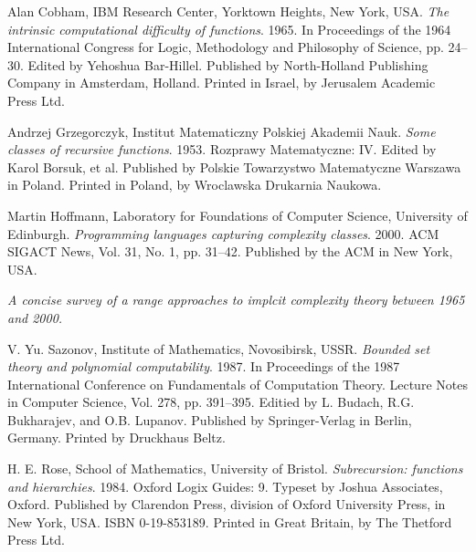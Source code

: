 \begin{thebibliography}{9} %


Alan Cobham, IBM Research Center, Yorktown Heights, New York, USA. \emph{The
intrinsic computational difficulty of functions}. 1965. In Proceedings of the
1964 International Congress for Logic, Methodology and Philosophy of Science,
pp. 24--30. Edited by Yehoshua Bar-Hillel. Published by North-Holland
Publishing Company in Amsterdam, Holland.  Printed in Israel, by Jerusalem
Academic Press Ltd.

\backrefprint


Andrzej Grzegorczyk, Institut Matematiczny Polskiej Akademii Nauk. \emph{Some
classes of recursive functions}. 1953. Rozprawy Matematyczne: IV. Edited by
Karol Borsuk, et al. Published by Polskie Towarzystwo Matematyczne Warszawa in
Poland. Printed in Poland, by Wroclawska Drukarnia Naukowa.

\backrefprint


Martin Hoffmann, Laboratory for Foundations of Computer Science, University of
Edinburgh. \emph{Programming languages capturing complexity classes}. 2000. ACM
SIGACT News, Vol. 31, No. 1, pp. 31--42. Published by the ACM in New York, USA.

\emph{A concise survey of a range approaches to implcit complexity theory
between 1965 and 2000.}

\backrefprint


V. Yu. Sazonov, Institute of Mathematics, Novosibirsk, USSR. \emph{Bounded set
theory and polynomial computability}. 1987. In Proceedings of the 1987
International Conference on Fundamentals of Computation Theory. Lecture Notes
in Computer Science, Vol. 278, pp. 391--395. Editied by L. Budach, R.G.
Bukharajev, and O.B. Lupanov. Published by Springer-Verlag in Berlin, Germany.
Printed by Druckhaus Beltz.

\backrefprint



H. E. Rose, School of Mathematics, University of Bristol. \emph{Subrecursion:
functions and hierarchies}. 1984. Oxford Logix Guides: 9. Typeset by Joshua
Associates, Oxford.  Published by Clarendon Press, division of Oxford
University Press, in New York, USA. ISBN 0-19-853189. Printed in Great Britain,
by The Thetford Press Ltd.

\backrefprint

\end{thebibliography}
